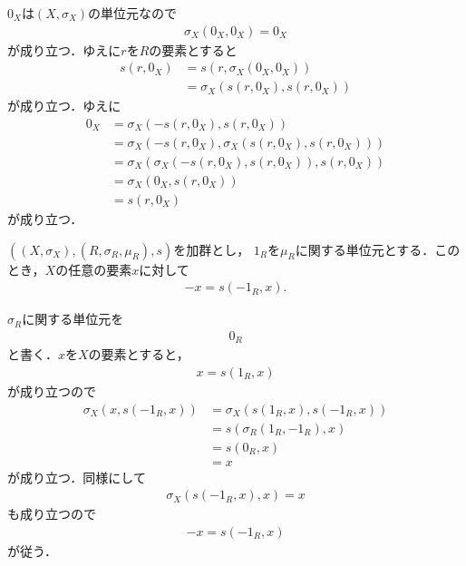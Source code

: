 	\begin{sketch}
		$0_X$は$(X,\sigma_X)$の単位元なので
		\begin{align}
			\sigma_X\left(0_X,0_X\right) = 0_X
		\end{align}
		が成り立つ．ゆえに$r$を$R$の要素とすると
		\begin{align}
			s\left(r,0_X\right) &= s\left(r,\sigma_X\left(0_X,0_X\right)\right) \\
			&= \sigma_X\left(s\left(r,0_X\right),s\left(r,0_X\right)\right)
		\end{align}
		が成り立つ．ゆえに
		\begin{align}
			0_X &= \sigma_X\left(-s\left(r,0_X\right),s\left(r,0_X\right)\right) \\
			&= \sigma_X\left(-s\left(r,0_X\right),\sigma_X\left(s\left(r,0_X\right),s\left(r,0_X\right)\right)\right) \\
			&= \sigma_X\left(\sigma_X\left(-s\left(r,0_X\right),s\left(r,0_X\right)\right),s\left(r,0_X\right)\right) \\
			&= \sigma_X\left(0_X,s\left(r,0_X\right)\right) \\
			&= s\left(r,0_X\right)
		\end{align}
		が成り立つ．
		\QED
	\end{sketch}
	
	\begin{screen}
		\begin{thm}\label{thm:inverse_element_equals_to_its_minus}
			$\left((X,\sigma_X),(R,\sigma_R,\mu_R),s\right)$を加群とし，
			$1_R$を$\mu_R$に関する単位元とする．このとき，$X$の任意の要素$x$に対して
			\begin{align}
				-x = s\left(-1_R,x\right).
			\end{align}
		\end{thm}
	\end{screen}
	
	\begin{sketch}
		$\sigma_R$に関する単位元を
		\begin{align}
			0_R
		\end{align}
		と書く．$x$を$X$の要素とすると，
		\begin{align}
			x = s\left(1_R,x\right)
		\end{align}
		が成り立つので
		\begin{align}
			\sigma_X\left(x,s\left(-1_R,x\right)\right) &= \sigma_X\left(s\left(1_R,x\right),s\left(-1_R,x\right)\right) \\
			&= s\left(\sigma_R\left(1_R,-1_R\right),x\right) \\
			&= s\left(0_R,x\right) \\
			&= x
		\end{align}
		が成り立つ．同様にして
		\begin{align}
			\sigma_X\left(s\left(-1_R,x\right),x\right) = x
		\end{align}
		も成り立つので
		\begin{align}
			-x = s\left(-1_R,x\right)
		\end{align}
		が従う．
		\QED
	\end{sketch}
	
	\begin{screen}
		\begin{dfn}[加群準同型]
			
		\end{dfn}
	\end{screen}